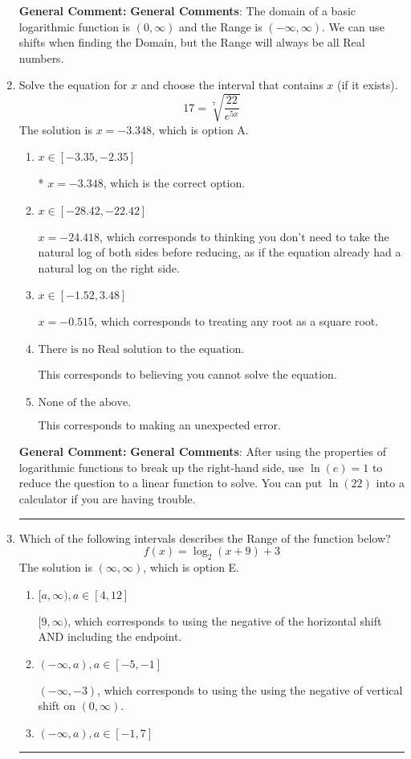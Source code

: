 \documentclass{extbook}[14pt]
\newcommand{\litem}[1]{\item #1

\rule{\textwidth}{0.4pt}}
\begin{document}
\begin{enumerate}
{\textbf{General Comment:} \textbf{General Comments}: The domain of a basic logarithmic function is $(0, \infty)$ and the Range is $(-\infty, \infty)$. We can use shifts when finding the Domain, but the Range will always be all Real numbers.
}
\litem{
 Solve the equation for $x$ and choose the interval that contains $x$ (if it exists).
\[  17 = \sqrt[7]{\frac{22}{e^{5x}}} \]The solution is \( x = -3.348 \), which is option A.\begin{enumerate}[label=\Alph*.]
\item \( x \in [-3.35, -2.35] \)

* $x = -3.348$, which is the correct option.
\item \( x \in [-28.42, -22.42] \)

$x = -24.418$, which corresponds to thinking you don't need to take the natural log of both sides before reducing, as if the equation already had a natural log on the right side.
\item \( x \in [-1.52, 3.48] \)

$x = -0.515$, which corresponds to treating any root as a square root.
\item \( \text{There is no Real solution to the equation.} \)

This corresponds to believing you cannot solve the equation.
\item \( \text{None of the above.} \)

This corresponds to making an unexpected error.
\end{enumerate}

\textbf{General Comment:} \textbf{General Comments}: After using the properties of logarithmic functions to break up the right-hand side, use $\ln(e) = 1$ to reduce the question to a linear function to solve. You can put $\ln(22)$ into a calculator if you are having trouble.
}
\litem{
Which of the following intervals describes the Range of the function below?
\[ f(x) = \log_2{(x+9)}+3 \]The solution is \( (\infty, \infty) \), which is option E.\begin{enumerate}[label=\Alph*.]
\item \( [a, \infty), a \in [4, 12] \)

$[9, \infty)$, which corresponds to using the negative of the horizontal shift AND including the endpoint.
\item \( (-\infty, a), a \in [-5, -1] \)

$(-\infty, -3)$, which corresponds to using the using the negative of vertical shift on $(0, \infty)$.
\item \( (-\infty, a), a \in [-1, 7] \)


\end{enumerate}}
\end{enumerate}
\end{document}
